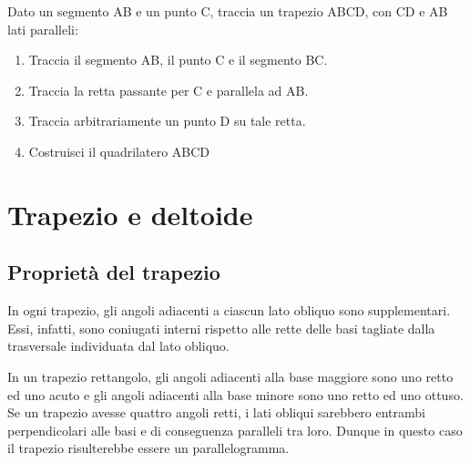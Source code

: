 \begin{procedura}
Dato un segmento AB e un punto C, traccia un trapezio ABCD, con CD e AB lati 
paralleli:
\begin{enumerate} [nosep]
\item 
Traccia il segmento AB, il punto C e il segmento BC.
\item 
Traccia la retta passante per C e parallela ad AB.
\item 
Traccia arbitrariamente un punto D su tale retta.
\item  
Costruisci il quadrilatero ABCD
\end{enumerate}
\end{procedura}

\section{Trapezio e deltoide}
\label{sect:trapezio_deltoide}


\subsection{Proprietà del trapezio}

In ogni trapezio, gli angoli adiacenti a ciascun lato obliquo sono 
supplementari. Essi, infatti, sono coniugati interni rispetto alle 
rette delle basi tagliate dalla trasversale individuata dal lato 
obliquo.

In un trapezio rettangolo, gli angoli adiacenti alla base maggiore 
sono uno retto ed uno acuto e gli angoli adiacenti alla base minore 
sono uno retto ed uno ottuso. Se un trapezio avesse quattro angoli 
retti, i lati obliqui sarebbero entrambi perpendicolari alle basi e 
di conseguenza paralleli tra loro. Dunque in questo caso il trapezio 
risulterebbe essere un parallelogramma.

